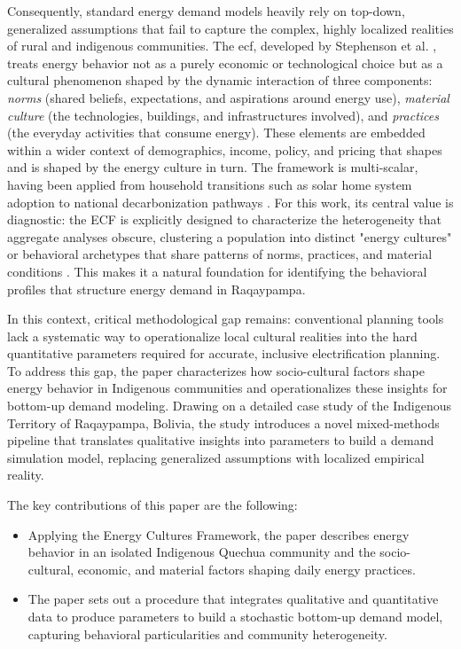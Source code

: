 \documentclass[final,3p,times,onecolumn]{elsarticle}
\begin{document}
Consequently, standard energy demand models heavily rely on top-down, generalized assumptions that fail to capture the complex, highly localized realities of rural and indigenous communities. The \gls{ecf}, developed by Stephenson et al. \cite{stephenson_energy_2010, stephenson_energy_2015}, treats energy behavior not as a purely economic or technological choice but as a cultural phenomenon shaped by the dynamic interaction of three components: \textit{norms} (shared beliefs, expectations, and aspirations around energy use), \textit{material culture} (the technologies, buildings, and infrastructures involved), and \textit{practices} (the everyday activities that consume energy). These elements are embedded within a wider context of demographics, income, policy, and pricing that shapes and is shaped by the energy culture in turn. The framework is multi-scalar, having been applied from household transitions such as solar home system adoption \cite{khan_impacts_2020} to national decarbonization pathways \cite{stephenson_energy_2021}. For this work, its central value is diagnostic: the ECF is explicitly designed to characterize the heterogeneity that aggregate analyses obscure, clustering a population into distinct "energy cultures" or behavioral archetypes that share patterns of norms, practices, and material conditions \cite{stephenson_energy_2010, m_heinrich_energy_2022}. This makes it a natural foundation for identifying the behavioral profiles that structure energy demand in Raqaypampa.

In this context, critical methodological gap remains: conventional planning tools lack a systematic way to operationalize local cultural realities into the hard quantitative parameters required for accurate, inclusive electrification planning. To address this gap, the paper characterizes how socio-cultural factors shape energy behavior in Indigenous communities and operationalizes these insights for bottom-up demand modeling. Drawing on a detailed case study of the Indigenous Territory of Raqaypampa, Bolivia, the study introduces a novel mixed-methods pipeline that translates qualitative insights into parameters to build a demand simulation model, replacing generalized assumptions with localized empirical reality. 

The key contributions of this paper are the following:

\begin{itemize}
    \item Applying the Energy Cultures Framework, the paper describes energy behavior in an isolated Indigenous Quechua community and the socio-cultural, economic, and material factors shaping daily energy practices.
    \item The paper sets out a procedure that integrates qualitative and quantitative data to produce parameters to build a stochastic bottom-up demand model, capturing behavioral particularities and community heterogeneity.
\end{itemize}
\end{document}
